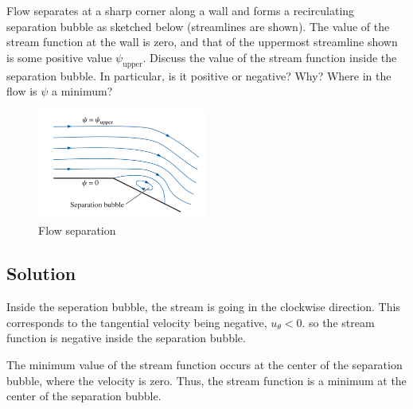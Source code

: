 \section{}


Flow separates at a sharp corner along a wall and forms a recirculating separation bubble as sketched below (streamlines are shown). The value of the stream function at the wall is zero, and that of the uppermost streamline shown is some positive value $\psi_{\text{upper}}$. Discuss the value of the stream function inside the separation bubble. In particular, is it positive or negative? Why? Where in the flow is $\psi$ a minimum?

\begin{figure}[h]
    \centering
    \includegraphics[width=0.5\textwidth]{Questions/Figures/q6 problem diagram.png}
    \caption{Flow separation}
\end{figure}

\subsection*{Solution}
Inside the seperation bubble, the stream is going in the clockwise direction. This corresponds to the tangential velocity being negative, $u_{\theta} < 0$. so the stream function is negative inside the separation bubble. 

The minimum value of the stream function occurs at the center of the separation bubble, where the velocity is zero. Thus, the stream function is a minimum at the center of the separation bubble.
